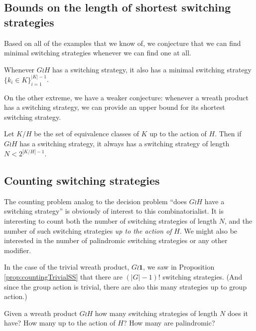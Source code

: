 \subsection{Bounds on the length of shortest switching strategies}
Based on all of the examples that we know of, we conjecture that we can find
minimal switching strategies whenever we can find one at all.
\begin{conjecture}
  Whenever $G \wr H$ has a switching strategy, it also has a minimal switching
  strategy $\{k_i \in K\}_{i=1}^{|K| - 1}$.
\end{conjecture}

On the other extreme, we have a weaker conjecture: whenever a wreath product has
a switching strategy, we can provide an upper bound for its shortest switching
strategy.

\begin{conjecture}
  Let $K/H$ be the set of equivalence classes of $K$ up to the action of $H$.
  Then if $G \wr H$ has a switching strategy, it always has a switching strategy
  of length $N < 2^{|K/H|-1}$.
\end{conjecture}

\subsection{Counting switching strategies}
The counting problem analog to the decision problem
``does $G \wr H$ have a switching strategy'' is obviously of interest to this
combinatorialist. It is interesting to count both the number of switching
strategies of length $N$, and the number of such switching strategies
\textit{up to the action of} $H$. We might also be interested in the number of
palindromic switching strategies or any other modifier.

In the case of the trivial wreath product, $G \wr \mathbf{1}$, we saw in
Proposition \ref{prop:countingTrivialSS} that there are $(|G| - 1)!$
switching strategies. (And since the group action is trivial, there are also
this many strategies up to group action.)

\begin{openquestion}
  Given a wreath product $G \wr H$ how many switching strategies of length $N$
  does it have? How many up to the action of $H$? How many are palindromic?
\end{openquestion}

